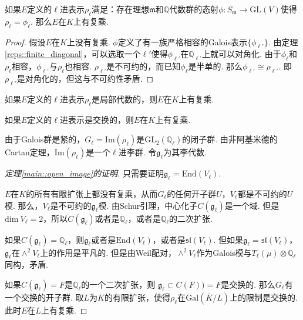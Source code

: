 \begin{cthm}
    如果$E$定义的$\ell$进表示$\rho_{\ell}$满足：存在理想$\mathfrak{m}$和$\mathbb{Q}$代数群的态射$\phi: S_{\mathfrak{m}}\to \mathrm{GL}(V)$使得$\rho_{\ell} = \phi_{\ell}$. 那么$E$在$K$上有复乘.
\end{cthm}

\begin{proof}
    假设$E$在$K$上没有复乘.
    $\phi$定义了有一族严格相容的Galois表示$\{\phi_{\ell'}\}$.
    由定理\ref{reps::finite_diagonal}，可以选取一个$\ell'$使得$\phi_{\ell'}$在$\mathbb{Q}_{\ell'}$上就可以对角化. 
    由于$\phi_{\ell}$和$\rho_{\ell}$相容，$\phi_{\ell'}$与$\rho_{\ell}$也相容.
    $\rho_{\ell'}$是不可约的，而已知$\phi_{\ell}$是半单的. 那么$\phi_{\ell'}\cong \rho_{\ell'}$.
    即$\rho_{\ell'}$是对角化的，但这与不可约性矛盾.
\end{proof}

\begin{ccor}
    如果$E$定义的$\ell$进表示$\rho_{\ell}$是局部代数的，则$E$在$K$上有复乘. \label{reps::when_cm}
\end{ccor}

\begin{ccor}
    如果$E$定义的$\ell$进表示是交换的，则$E$在$K$上有复乘.
\end{ccor}

由于Galois群是紧的，$G_{\ell} = \mathrm{Im}(\rho_\ell)$是$\mathrm{GL}_2(\mathbb{Q}_{\ell})$的闭子群. 由非阿基米德的Cartan定理，$\mathrm{Im}(\rho_{\ell})$是一个$\ell$进李群. 令$\mathfrak{g}_{\ell}$为其李代数.

\begin{proof}[定理\ref{main::open_image}的证明]
    只需要证明$\mathfrak{g}_{\ell} = \mathrm{End}(V_{\ell})$.

    $E$在$K$的所有有限扩张上都没有复乘，从而$G_{\ell}$的任何开子群$U$，$V_{\ell}$都是不可约的$U$模. 那么，$V_{\ell}$是不可约的$\mathfrak{g}_{\ell}$模. 由Schur引理，中心化子$C(\mathfrak{g}_{\ell})$是一个域. 但是$\mathrm{dim}\ V_{\ell}=2$，所以$C(\mathfrak{g}_{\ell})$或者是$\mathbb{Q}_{\ell}$，或者是$\mathbb{Q}_{\ell}$的二次扩张.

    如果$C(\mathfrak{g}_{\ell}) = \mathbb{Q}_{\ell}$，则$\mathfrak{g}_{\ell}$或者是$\mathrm{End}(V_{\ell})$，或者是$\mathfrak{sl}(V_{\ell})$. 但如果$\mathfrak{g}_{\ell} = \mathfrak{sl}(V_{\ell})$，$\mathfrak{g}_{\ell}$在$\wedge^2 V_{\ell}$上的作用是平凡的. 但是由Weil配对，$\wedge^2 V_{\ell}$作为Galois模与$T_{\ell}(\mu)\otimes \mathbb{Q}_{\ell}$同构，矛盾.

    如果$C(\mathfrak{g}_{\ell}) = F$是$\mathbb{Q}_{\ell}$的一个二次扩张，则
    $\mathfrak{g}_{\ell}\subset C(F)) = F$是交换的. 那么$G_{\ell}$有一个交换的开子群.
    取$L$为$K$的有限扩张，使得$\rho_{\ell}$在$\mathrm{Gal}(\overline{K}/L)$上的限制是交换的.
    此时$E$在$L$上有复乘.

\end{proof}
